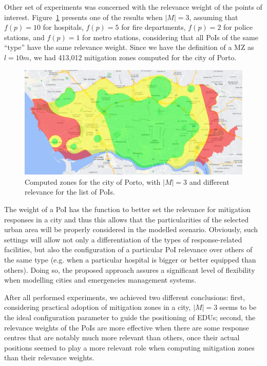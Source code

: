 \begin{refsection}
Other set of experiments was concerned with the relevance weight of the points of interest. Figure~\ref{Fig:zones_porto_3_weight} presents one of the results when $|M|=3$, assuming that $f(p)=10$ for hospitals, $f(p)=5$ for fire departments, $f(p)=2$ for police stations, and $f(p)=1$ for metro stations, considering that all PoIs of the same ``type'' have the same relevance weight. Since we have the definition of a MZ as $l = 10m$, we had 413,012 mitigation zones computed for the city of Porto.

\begin{figure}[ht!]
  \centering
  \includegraphics[width=0.9\linewidth]{Chapters/3-EDUs/images/porto_M3.png}
  \caption{Computed zones for the city of Porto, with $|M|=3$ and different relevance for the list of PoIs.}\label{Fig:zones_porto_3_weight}
\end{figure}

The weight of a PoI has the function to better set the relevance for mitigation responses in a city and thus this allows that the particularities of the selected urban area will be properly considered in the modelled scenario. Obviously, such settings will allow not only a differentiation of the types of response-related facilities, but also the configuration of a particular PoI relevance over others of the same type (e.g. when a particular hospital is bigger or better equipped than others). Doing so, the proposed approach assures a significant level of flexibility when modelling cities and emergencies management systems.

After all performed experiments, we achieved two different conclusions: first, considering practical adoption of mitigation zones in a city, $|M|=3$ seems to be the ideal configuration parameter to guide the positioning of EDUs; second, the relevance weights of the PoIs are more effective when there are some response centres that are notably much more relevant than others, once their actual positions seemed to play a more relevant role when computing mitigation zones than their relevance weights.  


\end{refsection}
